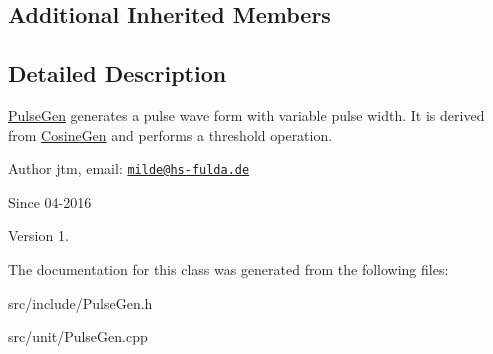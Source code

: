 \subsection*{Additional Inherited Members}


\subsection{Detailed Description}
\hyperlink{classunit_1_1PulseGen}{Pulse\-Gen} generates a pulse wave form with variable pulse width. It is derived from \hyperlink{classunit_1_1CosineGen}{Cosine\-Gen} and performs a threshold operation.

\begin{DoxyAuthor}{Author}
jtm, email\-:  \href{mailto:milde@hs-fulda.de}{\tt milde@hs-\/fulda.\-de} 
\end{DoxyAuthor}
\begin{DoxySince}{Since}
04-\/2016 
\end{DoxySince}
\begin{DoxyVersion}{Version}
1. 
\end{DoxyVersion}


The documentation for this class was generated from the following files\-:\begin{DoxyCompactItemize}
\item 
src/include/Pulse\-Gen.\-h\item 
src/unit/Pulse\-Gen.\-cpp\end{DoxyCompactItemize}
